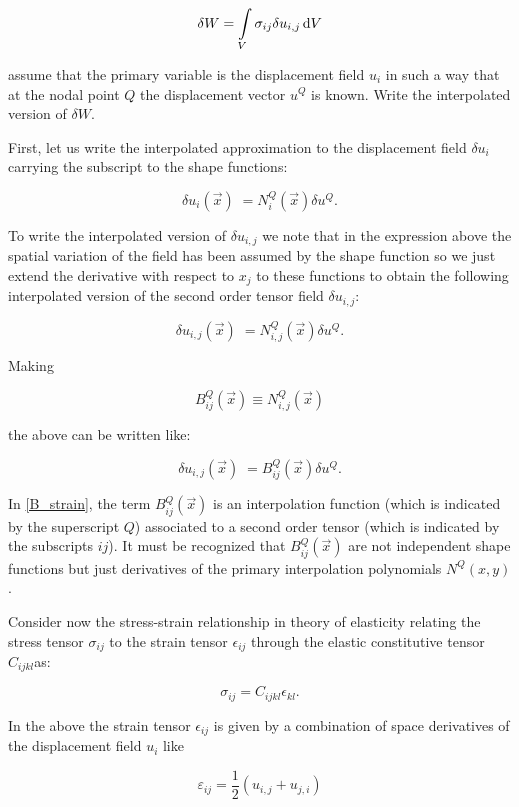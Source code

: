 \[ \delta W = \int\limits_V \sigma_{ij} \delta u_{i,j} \dd{V} \]

assume that the primary variable is the displacement field $u_i$ in such a way that at the nodal point $Q$ the displacement vector $u^Q$ is known. Write the interpolated version of $\delta W.$

First, let us write the interpolated approximation to the displacement field $\delta u_i$ carrying the subscript to the shape functions:

\[\delta u_i(\overrightarrow x)\;=N_i^Q(\overrightarrow x)\delta u^Q.\]

To write the interpolated version of $\delta u_{i,j}$ we note that in the expression above the spatial variation of the field has been assumed by the shape function so we just extend the derivative with respect to $x_j$ to these functions to obtain the following interpolated version of the second order tensor field $\delta u_{i,j}$:

\[\delta u_{i,j}(\overrightarrow x)\;=N_{i,j}^Q(\overrightarrow x)\delta u^Q.\]

Making

\[B_{ij}^Q(\overrightarrow x)\equiv N_{i,j}^Q(\overrightarrow x) \]

the above can be written like:

\begin{equation} 
\delta u_{i,j}(\overrightarrow x)\;=B_{ij}^Q(\overrightarrow x)\delta u^Q.
\label{B_strain}
\end{equation}

In \cref{B_strain}, the term $B_{ij}^Q(\overrightarrow x)$ is an interpolation function (which is indicated by the superscript $Q$) associated to a second order tensor (which is indicated by the subscripts $ij$). It must be recognized that $B_{ij}^Q(\overrightarrow x)$ are not independent shape functions but just derivatives of the primary interpolation polynomials $N^Q (x,y)$.

Consider now the stress-strain relationship in theory of elasticity relating the stress tensor $\sigma_{ij}$ to the strain tensor $\epsilon_{ij}$ through the elastic constitutive tensor $C_{ijkl}$as:

\[\sigma_{ij} = C_{ijkl} \epsilon_{kl}.\]

In the above the strain tensor $\epsilon_{ij}$ is given by a combination of space derivatives of the displacement field $u_i$ like

\[ \varepsilon_{ij}=\frac12(u_{i,j}+u_{j,i}) \]

